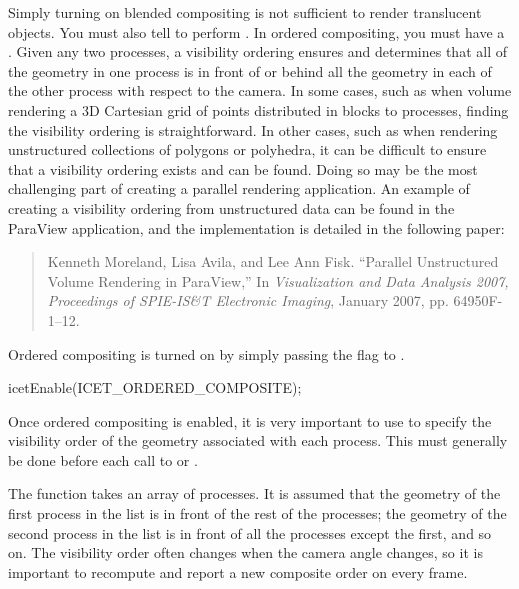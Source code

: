 
Simply turning on blended compositing is not sufficient to render
translucent objects.  You must also tell \IceT to perform .  In ordered compositing, you must have a
.  Given any two
processes, a visibility ordering ensures and determines that all of the
geometry in one process is in front of or behind all the geometry in each
of the other process with respect to the camera.  In some cases, such as
when volume rendering a 3D Cartesian grid of points distributed in blocks
to processes, finding the visibility ordering is straightforward.  In other
cases, such as when rendering unstructured collections of polygons or
polyhedra, it can be difficult to ensure that a visibility ordering exists
and can be found.  Doing so may be the most challenging part of creating a
parallel rendering application.  An example of creating a visibility
ordering from unstructured data can be found in the ParaView application,
and the implementation is detailed in the following paper:

\begin{quote}
  Kenneth Moreland, Lisa Avila, and Lee Ann Fisk. ``Parallel Unstructured
  Volume Rendering in ParaView,'' In \emph{Visualization and Data Analysis
    2007, Proceedings of SPIE-IS\&T Electronic Imaging}, January 2007,
  pp. 64950F-1--12.
\end{quote}

Ordered compositing is turned on by simply passing the
 flag to .
\begin{code}
icetEnable(ICET_ORDERED_COMPOSITE);
\end{code}

Once ordered compositing is enabled, it is very important to use
 to specify the visibility order of the geometry
associated with each process.  This must generally be done before each call
to  or .
\begin{Table}{1}
  \textC{(} 
   \textC{);}
\end{Table}
The  function takes an array of processes.  It is
assumed that the geometry of the first process in the list is in front of
the rest of the processes; the geometry of the second process in the list
is in front of all the processes except the first, and so on.  The
visibility order often changes when the camera angle changes, so it is
important to recompute and report a new composite order on every frame.

